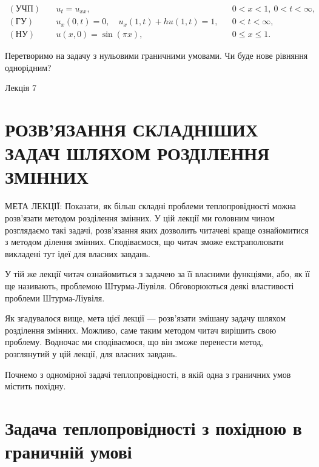 \documentclass[
  ukrainian,
]{article}
\begin{document}
\[
\begin{aligned}
(\text{УЧП})\quad & u_t = u_{xx}, && 0 < x < 1,\ 0 < t < \infty, \\
(\text{ГУ})\quad & u_x(0,t) = 0,\quad u_x(1,t) + h u(1,t) = 1, && 0 < t < \infty, \\
(\text{НУ})\quad & u(x,0) = \sin(\pi x), && 0 \leqslant x \leqslant 1.
\end{aligned}
\]

Перетворимо на задачу з нульовими граничними умовами. Чи буде нове
рівняння однорідним?

Лекція 7

\section{РОЗВ'ЯЗАННЯ СКЛАДНІШИХ ЗАДАЧ ШЛЯХОМ РОЗДІЛЕННЯ
ЗМІННИХ}\label{ux440ux43eux437ux432ux44fux437ux430ux43dux43dux44f-ux441ux43aux43bux430ux434ux43dux456ux448ux438ux445-ux437ux430ux434ux430ux447-ux448ux43bux44fux445ux43eux43c-ux440ux43eux437ux434ux456ux43bux435ux43dux43dux44f-ux437ux43cux456ux43dux43dux438ux445}

МЕТА ЛЕКЦІЇ: Показати, як більш складні проблеми теплопровідності можна
розв'язати методом розділення змінних. У цій лекції ми головним чином
розглядаємо такі задачі, розв'язання яких дозволить читачеві краще
ознайомитися з методом ділення змінних. Сподіваємося, що читач зможе
екстраполювати викладені тут ідеї для власних завдань.

У тій же лекції читач ознайомиться з задачею за її власними функціями,
або, як її ще називають, проблемою Штурма-Ліувіля. Обговорюються деякі
властивості проблеми Штурма-Ліувіля.

Як згадувалося вище, мета цієї лекції --- розв'язати змішану задачу
шляхом розділення змінних. Можливо, саме таким методом читач вирішить
свою проблему. Водночас ми сподіваємося, що він зможе перенести метод,
розглянутий у цій лекції, для власних завдань.

Почнемо з одномірної задачі теплопровідності, в якій одна з граничних
умов містить похідну.

\section{Задача теплопровідності з похідною в граничній
умові}\label{ux437ux430ux434ux430ux447ux430-ux442ux435ux43fux43bux43eux43fux440ux43eux432ux456ux434ux43dux43eux441ux442ux456-ux437-ux43fux43eux445ux456ux434ux43dux43eux44e-ux432-ux433ux440ux430ux43dux438ux447ux43dux456ux439-ux443ux43cux43eux432ux456}
\end{document}
